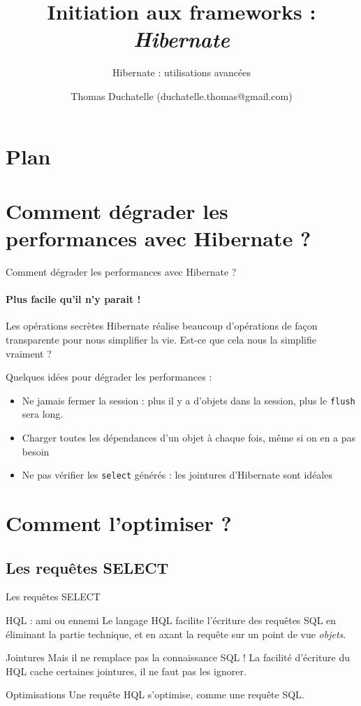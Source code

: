 \documentclass[compress]{beamer}%
\title{Initiation aux frameworks : \emph{Hibernate}}
\subtitle{Hibernate : utilisations avancées}
\author{Thomas Duchatelle (duchatelle.thomas@gmail.com)}
\institute{Capgemini, pour Yves Rocher}
\begin{document}
\frame{\titlepage}
  
\section*{Plan}
\frame{\tableofcontents[hideallsubsections]}
	
\section{Comment dégrader les performances avec Hibernate ?}

\begin{frame}{Comment dégrader les performances avec Hibernate ?}
	\framesubtitle{Plus facile qu'il n'y parait !}
	
	\begin{block}{Les opérations secrètes}
	Hibernate réalise beaucoup d'opérations de façon transparente pour nous simplifier la vie. Est-ce que cela nous la simplifie vraiment ?
	\end{block}		
	
	\pause
	Quelques idées pour dégrader les performances : 
	\begin{itemize}[<+->]
	\item Ne jamais fermer la session : plus il y a d'objets dans la session, plus le \texttt{flush} sera long.
	\item Charger toutes les dépendances d'un objet à chaque fois, même si on en a pas besoin
	\item Ne pas vérifier les \texttt{select} générés : les jointures d'Hibernate sont idéales
	\end{itemize}
\end{frame}


\section{Comment l'optimiser ?}

\subsection{Les requêtes SELECT}
\begin{frame}{Les requêtes SELECT}
	
	\begin{block}{HQL : ami ou ennemi}
	Le langage HQL facilite l'écriture des requêtes SQL en éliminant la partie technique, et en axant la requête sur un point de vue \emph{objets}.
	\end{block}
	
	\pause
	\begin{alertblock}{Jointures}
	Mais il ne remplace pas la connaissance SQL ! La facilité d'écriture du HQL cache certaines jointures, il ne faut pas les ignorer.
	\end{alertblock}
	
	\pause
	\begin{block}{Optimisations}
	Une requête HQL s'optimise, comme une requête SQL.
	\end{block}
\end{frame}
\end{document}
